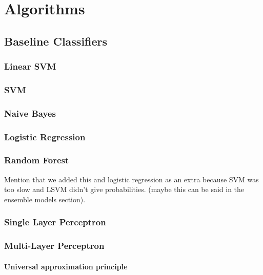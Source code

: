 \documentclass[epsfig,a4paper,11pt,titlepage,twoside,openany]{book}
\begin{document}

\chapter{Algorithms}
\label{chap:algorithms}

\section{Baseline Classifiers}
\label{sec:baseline-classifiers}

\subsection{Linear SVM}
\label{sec:clf-lsvm}

\subsection{SVM}
\label{sec:clf-svm}

\subsection{Naive Bayes}
\label{sec:clf-nb}

\subsection{Logistic Regression}
\label{sec:clf-lr}

\subsection{Random Forest}
\label{sec:clf-rgc}

Mention that we added this and logistic regression as an extra because SVM was
too slow and LSVM didn't give probabilities. (maybe this can be said in the
ensemble models section).

\subsection{Single Layer Perceptron}
\label{sec:clf-slp}

\subsection{Multi-Layer Perceptron}
\label{sec:clf-mlp}

\subsubsection{Universal approximation principle}
\label{sec:universal-apprx-principle}
\end{document}
